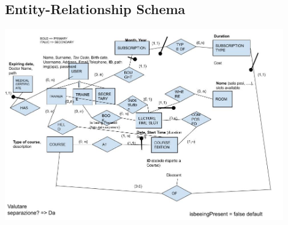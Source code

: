 \subsection{Entity-Relationship Schema}
    \begin{center}
        \includegraphics[width=0.9\textwidth]{resources/SchemaEr.jpg}
    \end{center}

